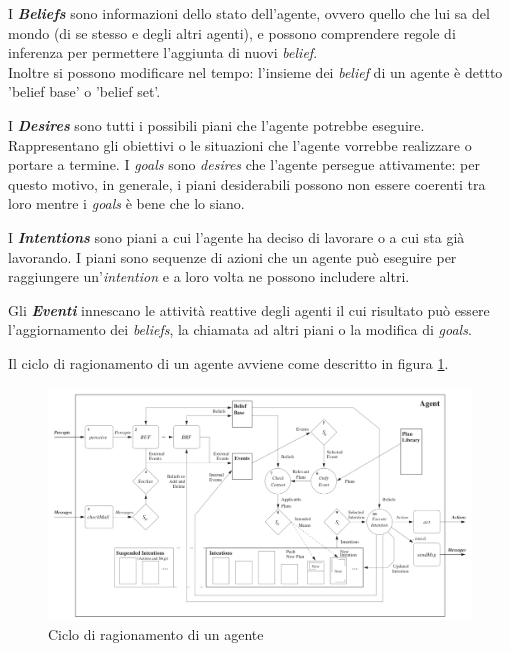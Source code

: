 \documentclass[12pt,a4paper,openright,twoside]{report}
\begin{document}
I \textbf{\textit{Beliefs}} sono informazioni dello stato dell'agente, ovvero quello che lui sa del mondo (di se stesso e degli altri agenti), e possono comprendere regole di inferenza per permettere l'aggiunta di nuovi \textit{belief}.
\\Inoltre si possono modificare nel tempo: l'insieme dei \textit{belief} di un agente \`e dettto 'belief base' o 'belief set'.

I \textbf{\textit{Desires}} sono tutti i possibili piani che l'agente potrebbe eseguire. Rappresentano gli obiettivi o le situazioni che l'agente vorrebbe realizzare o portare a termine. I \textit{goals} sono \textit{desires} che l'agente persegue attivamente: per questo motivo, in generale, i piani desiderabili possono non essere coerenti tra loro mentre i \textit{goals} \`e bene che lo siano.

I \textbf{\textit{Intentions}} sono piani a cui l'agente ha deciso di lavorare o a cui sta gi\`a lavorando. I piani sono sequenze di azioni che un agente pu\`o eseguire per raggiungere un'\textit{intention} e a loro volta ne possono includere altri.

Gli \textbf{\textit{Eventi}} innescano le attivit\`a reattive degli agenti il cui risultato pu\`o essere l'aggiornamento dei \textit{beliefs}, la chiamata ad altri piani o la modifica di \textit{goals}.

Il ciclo di ragionamento di un agente avviene come descritto in figura \ref{fig:reasoningCicle}.
\begin{figure}[h] %
\begin{center} %
\includegraphics[width=16cm]{images/reasoningCicle.png} %
\caption[Ciclo di ragionamento di un agente]{Ciclo di ragionamento di un agente} \label{fig:reasoningCicle}
\end{center}
\end{figure}
\end{document}
